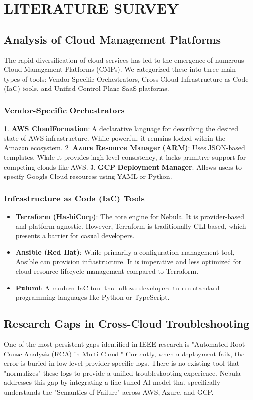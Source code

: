 \chapter{LITERATURE SURVEY}

\section{Analysis of Cloud Management Platforms}
The rapid diversification of cloud services has led to the emergence of numerous Cloud Management Platforms (CMPs). We categorized these into three main types of tools: Vendor-Specific Orchestrators, Cross-Cloud Infrastructure as Code (IaC) tools, and Unified Control Plane SaaS platforms.

\subsection{Vendor-Specific Orchestrators}
1. \textbf{AWS CloudFormation}: A declarative language for describing the desired state of AWS infrastructure. While powerful, it remains locked within the Amazon ecosystem.
2. \textbf{Azure Resource Manager (ARM)}: Uses JSON-based templates. While it provides high-level consistency, it lacks primitive support for competing clouds like AWS.
3. \textbf{GCP Deployment Manager}: Allows users to specify Google Cloud resources using YAML or Python. 

\subsection{Infrastructure as Code (IaC) Tools}
\begin{itemize}
    \item \textbf{Terraform (HashiCorp)}: The core engine for Nebula. It is provider-based and platform-agnostic. However, Terraform is traditionally CLI-based, which presents a barrier for casual developers.
    \item \textbf{Ansible (Red Hat)}: While primarily a configuration management tool, Ansible can provision infrastructure. It is imperative and less optimized for cloud-resource lifecycle management compared to Terraform.
    \item \textbf{Pulumi}: A modern IaC tool that allows developers to use standard programming languages like Python or TypeScript. 
\end{itemize}

\section{Research Gaps in Cross-Cloud Troubleshooting}
One of the most persistent gaps identified in IEEE research is "Automated Root Cause Analysis (RCA) in Multi-Cloud." Currently, when a deployment fails, the error is buried in low-level provider-specific logs. There is no existing tool that "normalizes" these logs to provide a unified troubleshooting experience. Nebula addresses this gap by integrating a fine-tuned AI model that specifically understands the "Semantics of Failure" across AWS, Azure, and GCP.

